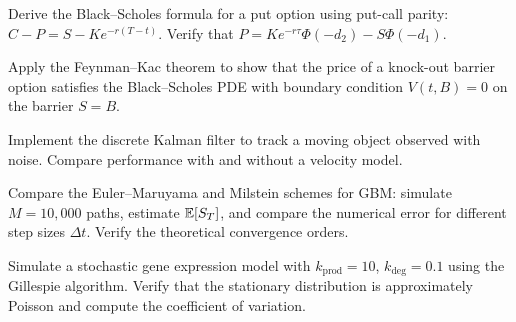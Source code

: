 \begin{exercise}
Derive the Black--Scholes formula for a put option using put-call
parity: $C - P = S - Ke^{-r(T-t)}$. Verify that
$P = Ke^{-r\tau}\Phi(-d_2) - S\Phi(-d_1)$.
\end{exercise}

\begin{exercise}
Apply the Feynman--Kac theorem to show that the price of a knock-out
barrier option satisfies the Black--Scholes PDE with boundary condition
$V(t, B) = 0$ on the barrier $S = B$.
\end{exercise}

\begin{exercise}
Implement the discrete Kalman filter to track a moving object observed
with noise. Compare performance with and without a velocity model.
\end{exercise}

\begin{exercise}
Compare the Euler--Maruyama and Milstein schemes for GBM: simulate
$M = 10{,}000$ paths, estimate $\mathbb{E}[S_T]$, and compare the numerical
error for different step sizes $\Delta t$. Verify the theoretical
convergence orders.
\end{exercise}

\begin{exercise}
Simulate a stochastic gene expression model with
$k_{\text{prod}} = 10$, $k_{\text{deg}} = 0.1$ using the Gillespie
algorithm. Verify that the stationary distribution is approximately
Poisson and compute the coefficient of variation.
\end{exercise}
